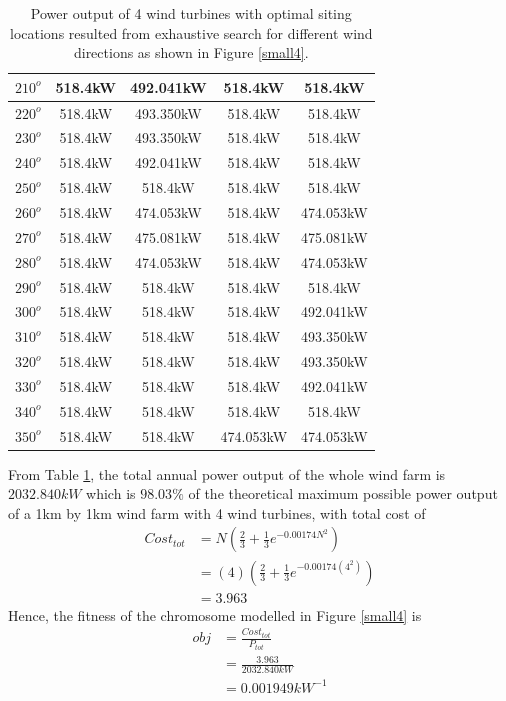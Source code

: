 \begin{table}[H]
\begin{tabular}{|c|c|c|c|c|}
        		$210^o$	& 518.4kW	& 492.041kW	& 518.4kW	& 518.4kW	\\ \hline
        		$220^o$	& 518.4kW	& 493.350kW	& 518.4kW	& 518.4kW	\\ \hline
        		$230^o$	& 518.4kW	& 493.350kW	& 518.4kW	& 518.4kW	\\ \hline
        		$240^o$	& 518.4kW	& 492.041kW	& 518.4kW	& 518.4kW	\\ \hline
        		$250^o$	& 518.4kW	& 518.4kW	& 518.4kW	& 518.4kW	\\ \hline
        		$260^o$	& 518.4kW	& 474.053kW	& 518.4kW	& 474.053kW	\\ \hline
        		$270^o$	& 518.4kW	& 475.081kW	& 518.4kW	& 475.081kW	\\ \hline
        		$280^o$	& 518.4kW	& 474.053kW	& 518.4kW	& 474.053kW	\\ \hline
        		$290^o$	& 518.4kW	& 518.4kW	& 518.4kW	& 518.4kW	\\ \hline
        		$300^o$	& 518.4kW	& 518.4kW	& 518.4kW	& 492.041kW	\\ \hline
        		$310^o$	& 518.4kW	& 518.4kW	& 518.4kW	& 493.350kW	\\ \hline
        		$320^o$	& 518.4kW	& 518.4kW	& 518.4kW	& 493.350kW	\\ \hline
        		$330^o$	& 518.4kW	& 518.4kW	& 518.4kW	& 492.041kW	\\ \hline
        		$340^o$	& 518.4kW	& 518.4kW	& 518.4kW	& 518.4kW	\\ \hline
        		$350^o$	& 518.4kW	& 518.4kW	& 474.053kW	& 474.053kW	\\ \hline
        	\end{tabular}
        	\caption{Power output of 4 wind turbines with optimal siting locations resulted from exhaustive search for different wind directions as shown in Figure \ref{small4}.}
        	\label{table4}
        \end{table}
        \doublespacing
        
        From Table \ref{table4}, the total annual power output of the whole wind farm is $2032.840kW$ which is $98.03\%$ of the theoretical maximum possible power output of a 1km by 1km wind farm with 4 wind turbines, with total cost of
        \begin{align*}
            Cost_{tot}
            &= N\left(\frac{2}{3} + \frac{1}{3}e^{-0.00174N^2}\right) \\
            &= \left(4\right)\left(\frac{2}{3} + \frac{1}{3}e^{-0.00174\left(4^2\right)}\right) \\
            &= 3.963
        \end{align*}
        Hence, the fitness of the chromosome modelled in Figure \ref{small4} is
        \begin{align*}
            obj
            &=\frac{Cost_{tot}}{P_{tot}} \\
            &=\frac{3.963}{2032.840kW} \\
            &=0.001949kW^{-1}
        \end{align*}
        

